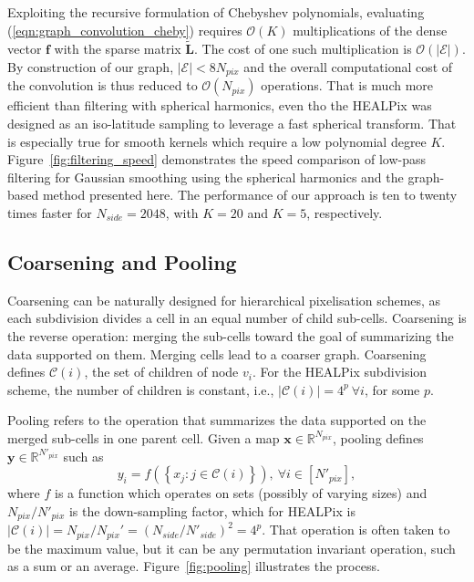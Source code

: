 \documentclass[final,twocolumn,3p,times,authoryear]{elsarticle}
\newcommand{\figref}[1]{Figure~\ref{fig:#1}}
\newcommand{\eqnref}[1]{(\ref{eqn:#1})}
\renewcommand{\b}[1]{{\bm{#1}}}   %
\newcommand{\1}{\b{1}}              %
\newcommand{\0}{\b{0}}              %
\newcommand{\E}{\mathcal{E}}
\newcommand{\C}{\mathcal{C}}
\renewcommand{\L}{\b{L}}
\newcommand{\tL}{\tilde{\L}}
\newcommand{\x}{\b{x}}
\newcommand{\y}{\b{y}}
\newcommand{\f}{\b{f}}
\newcommand{\R}{\mathbb{R}}
\newcommand{\bO}{\mathcal{O}}
\begin{document}
Exploiting the recursive formulation of Chebyshev polynomials, evaluating \eqnref{graph_convolution_cheby} requires $\bO(K)$ multiplications of the dense vector $\f$ with the sparse matrix $\tL$.
The cost of one such multiplication is $\bO(|\E|)$. By construction of our graph, $|\E| < 8 N_{pix}$ and the overall computational cost of the convolution is thus reduced to $\bO(N_{pix})$ operations.
That is much more efficient than filtering with spherical harmonics, even tho the HEALPix was designed as an iso-latitude sampling to leverage a fast spherical transform.
That is especially true for smooth kernels which require a low polynomial degree $K$.
\figref{filtering_speed} demonstrates the speed comparison of low-pass filtering for Gaussian smoothing using the spherical harmonics and the graph-based method presented here.
The performance of our approach is ten to twenty times faster for $N_{side} = 2048$, with $K=20$ and $K=5$, respectively.



\subsection{Coarsening and Pooling}

Coarsening can be naturally designed for hierarchical pixelisation schemes, as each subdivision divides a cell in an equal number of child sub-cells.
Coarsening is the reverse operation: merging the sub-cells toward the goal of summarizing the data supported on them.
Merging cells lead to a coarser graph.
Coarsening defines $\C(i)$, the set of children of node $v_i$.
For the HEALPix subdivision scheme, the number of children is constant, i.e., $| \C(i) | = 4^p \ \forall i$, for some $p$.

Pooling refers to the operation that summarizes the data supported on the merged sub-cells in one parent cell.
Given a map $\x \in \R^{N_{pix}}$, pooling defines $\y \in \R^{N'_{pix}}$ such as
\begin{equation} \label{eqn:pooling}
	y_i = f \left( \left\{ x_j : j \in \C(i) \right\} \right), \ \forall i \in [N'_{pix}],
\end{equation}
where $f$ is a function which operates on sets (possibly of varying sizes) and $N_{pix} / {N'_{pix}}$ is the down-sampling factor, which for HEALPix is $| \C(i) | = N_{pix} / {N_{pix}}' = (N_{side} / N'_{side})^2 = 4^p$.
That operation is often taken to be the maximum value, but it can be any permutation invariant operation, such as a sum or an average.
\figref{pooling} illustrates the process.
\end{document}
